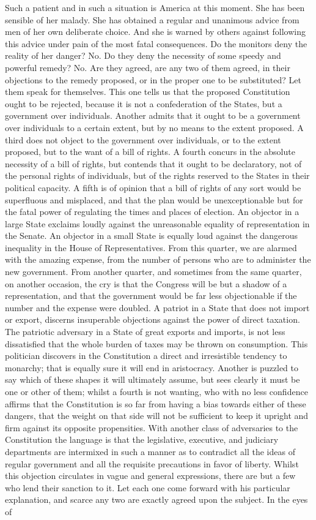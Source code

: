 Such a patient and in such a situation is America at this moment. She has been sensible of her malady. She has obtained a regular and unanimous advice from men of her own deliberate choice. And she is warned by others against following this advice under pain of the most fatal consequences. Do the monitors deny the reality of her danger? No. Do they deny the necessity of some speedy and powerful remedy? No. Are they agreed, are any two of them agreed, in their objections to the remedy proposed, or in the proper one to be substituted? Let them speak for themselves. This one tells us that the proposed Constitution ought to be rejected, because it is not a confederation of the States, but a government over individuals. Another admits that it ought to be a government over individuals to a certain extent, but by no means to the extent proposed. A third does not object to the government over individuals, or to the extent proposed, but to the want of a bill of rights. A fourth concurs in the absolute necessity of a bill of rights, but contends that it ought to be declaratory, not of the personal rights of individuals, but of the rights reserved to the States in their political capacity. A fifth is of opinion that a bill of rights of any sort would be superfluous and misplaced, and that the plan would be unexceptionable but for the fatal power of regulating the times and places of election. An objector in a large State exclaims loudly against the unreasonable equality of representation in the Senate. An objector in a small State is equally loud against the dangerous inequality in the House of Representatives. From this quarter, we are alarmed with the amazing expense, from the number of persons who are to administer the new government. From another quarter, and sometimes from the same quarter, on another occasion, the cry is that the Congress will be but a shadow of a representation, and that the government would be far less objectionable if the number and the expense were doubled. A patriot in a State that does not import or export, discerns insuperable objections against the power of direct taxation. The patriotic adversary in a State of great exports and imports, is not less dissatisfied that the whole burden of taxes may be thrown on consumption. This politician discovers in the Constitution a direct and irresistible tendency to monarchy; that is equally sure it will end in aristocracy. Another is puzzled to say which of these shapes it will ultimately assume, but sees clearly it must be one or other of them; whilst a fourth is not wanting, who with no less confidence affirms that the Constitution is so far from having a bias towards either of these dangers, that the weight on that side will not be sufficient to keep it upright and firm against its opposite propensities. With another class of adversaries to the Constitution the language is that the legislative, executive, and judiciary departments are intermixed in such a manner as to contradict all the ideas of regular government and all the requisite precautions in favor of liberty. Whilst this objection circulates in vague and general expressions, there are but a few who lend their sanction to it. Let each one come forward with his particular explanation, and scarce any two are exactly agreed upon the subject. In the eyes of 